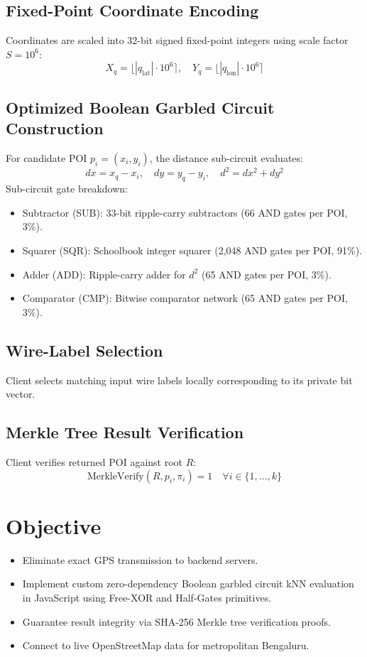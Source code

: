 \documentclass[12pt,a4paper,oneside]{report}
\begin{document}
\subsection{Fixed-Point Coordinate Encoding}
Coordinates are scaled into 32-bit signed fixed-point integers using scale factor $S = 10^6$:
\begin{equation}
X_q = \lfloor |q_{\text{lat}}| \cdot 10^6 \rceil, \quad Y_q = \lfloor |q_{\text{lon}}| \cdot 10^6 \rceil
\end{equation}

\subsection{Optimized Boolean Garbled Circuit Construction}
For candidate POI $p_i = (x_i, y_i)$, the distance sub-circuit evaluates:
\begin{equation}
dx = x_q - x_i, \quad dy = y_q - y_i, \quad d^2 = dx^2 + dy^2
\end{equation}
Sub-circuit gate breakdown:
\begin{itemize}
    \item Subtractor (SUB): 33-bit ripple-carry subtractors (66 AND gates per POI, 3\%).
    \item Squarer (SQR): Schoolbook integer squarer (2,048 AND gates per POI, 91\%).
    \item Adder (ADD): Ripple-carry adder for $d^2$ (65 AND gates per POI, 3\%).
    \item Comparator (CMP): Bitwise comparator network (65 AND gates per POI, 3\%).
\end{itemize}

\subsection{Wire-Label Selection}
Client selects matching input wire labels locally corresponding to its private bit vector.

\subsection{Merkle Tree Result Verification}
Client verifies returned POI against root $R$:
\begin{equation}
\text{MerkleVerify}(R, p_i, \pi_i) = 1 \quad \forall i \in \{1, \dots, k\}
\end{equation}

\section{Objective}
\begin{itemize}
    \item Eliminate exact GPS transmission to backend servers.
    \item Implement custom zero-dependency Boolean garbled circuit kNN evaluation in JavaScript using Free-XOR and Half-Gates primitives.
    \item Guarantee result integrity via SHA-256 Merkle tree verification proofs.
    \item Connect to live OpenStreetMap data for metropolitan Bengaluru.
\end{itemize}
\end{document}
